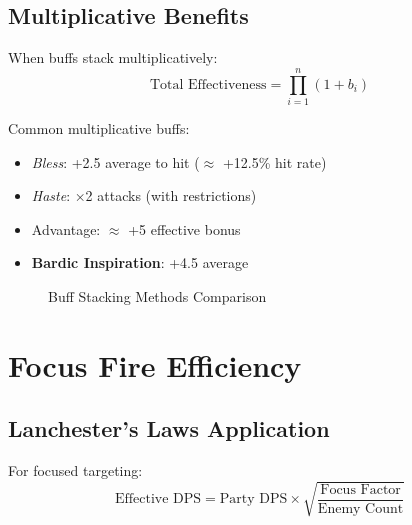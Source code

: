 \documentclass[11pt,letterpaper,openany]{book}
\newcommand{\spell}[1]{\textcolor{mysticblue}{\textit{#1}}}
\newcommand{\ability}[1]{\textcolor{dragongreen}{\textbf{#1}}}
\begin{document}
\subsection{Multiplicative Benefits}

When buffs stack multiplicatively:
\begin{equation}
\text{Total Effectiveness} = \prod_{i=1}^{n} (1 + b_i)
\end{equation}

Common multiplicative buffs:
\begin{itemize}
    \item \spell{Bless}: +2.5 average to hit ($\approx$ +12.5\% hit rate)
    \item \spell{Haste}: ×2 attacks (with restrictions)
    \item Advantage: $\approx$ +5 effective bonus
    \item \ability{Bardic Inspiration}: +4.5 average
\end{itemize}

\begin{figure}[h]
\centering
{}
\caption{Buff Stacking Methods Comparison}
\end{figure}

\section{Focus Fire Efficiency}

\subsection{Lanchester's Laws Application}

For focused targeting:
\begin{equation}
\text{Effective DPS} = \text{Party DPS} \times \sqrt{\frac{\text{Focus Factor}}{\text{Enemy Count}}}
\end{equation}
\end{document}
